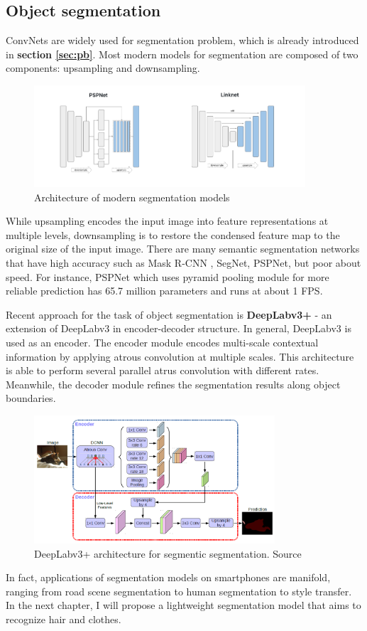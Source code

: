\subsection{Object segmentation}
ConvNets are widely used for segmentation problem, which is already introduced in \textbf{section \ref{sec:pb}}. Most modern models for segmentation are composed of two components: upsampling and downsampling. \par
\begin{figure} [H]
    \centering
    \includegraphics[width=0.9\textwidth]{chapter2/image/segnet.png}
    \caption{Architecture of modern segmentation models}
    \label{fig:my_label}
\end{figure}
While upsampling encodes the input image into feature representations at multiple levels, downsampling is to restore the condensed feature map to the original size of the input image. There are many semantic segmentation networks that have high accuracy such as Mask R-CNN \cite{maskrcnn}, SegNet\cite{segnet}, PSPNet\cite{pspnet}, but poor about speed. For instance, PSPNet which uses pyramid pooling module for more reliable prediction has 65.7 million parameters and runs at about 1 FPS.  \par

Recent approach for the task of object segmentation is \textbf{DeepLabv3+} - an extension of DeepLabv3 in encoder-decoder structure. In general, DeepLabv3 is used as an encoder. The encoder module encodes multi-scale contextual information by applying atrous convolution at multiple scales. This architecture is able to perform several parallel atrus convolution with different rates. Meanwhile, the decoder module refines the segmentation results along object boundaries. \par

\begin{figure} [H]
    \centering
    \includegraphics[width=0.8\textwidth]{chapter2/image/deeplab.png}
    \caption{DeepLabv3+ architecture for segmentic segmentation. Source \cite{deeplabv3plus}}
    \label{fig:my_label}
\end{figure}

In fact, applications of segmentation models on smartphones are manifold, ranging from road scene segmentation to human segmentation to style transfer. In the next chapter, I will propose a lightweight segmentation model that aims to recognize hair and clothes. \par



